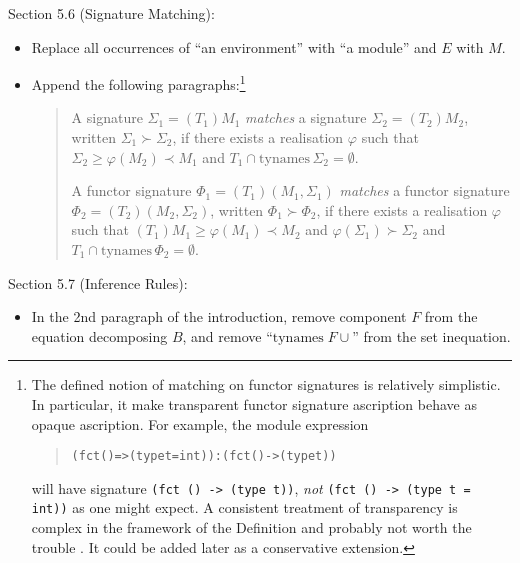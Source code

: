\documentclass[twoside,titlepage]{article}
\newcommand{\void}[1]{}
\begin{document}
\begin{appendix}
Section 5.6 (Signature Matching):
\begin{itemize}
\item Replace all occurrences of ``an environment'' with ``a module'' and $E$ with $M$.

\item Append the following paragraphs:\footnote{The defined notion of matching on functor signatures is relatively simplistic. In particular, it make transparent functor signature ascription behave as opaque ascription. For example, the module expression
\begin{quote}
\begin{alltt}
(fct () => (type t = int)) : (fct () -> (type t))
\end{alltt}
\end{quote}
will have signature {\tt (fct () -> (type t))}, \emph{not} {\tt (fct () -> (type t = int))} as one might expect. A consistent treatment of transparency is complex in the framework of the Definition and probably not worth the trouble \cite{higherfunctors}. It could be added later as a conservative extension.}
  \begin{quote}
\void{
  A signature $\Sigma_1 = (T_1)M_1$ \emph{matches} a signature $\Sigma_2 = (T_2)M_2$, written $\Sigma_1 \succ \Sigma_2$, if $M_1$ matches $\Sigma_2$ and $T_1 \cap \mbox{tynames}\,\Sigma_2 = \emptyset$ (possibly after changing the bound names in $T_1$).
}
  A signature $\Sigma_1 = (T_1)M_1$ \emph{matches} a signature $\Sigma_2 = (T_2)M_2$, written $\Sigma_1 \succ \Sigma_2$, if there exists a realisation $\varphi$ such that $\Sigma_2 \geq \varphi(M_2) \prec M_1$ and $T_1 \cap \mbox{tynames}\,\Sigma_2 = \emptyset$. %

  A functor signature $\Phi_1 = (T_1)(M_1,\Sigma_1)$ \emph{matches} a functor signature $\Phi_2 = (T_2)(M_2,\Sigma_2)$, written $\Phi_1 \succ \Phi_2$, if there exists a realisation $\varphi$ such that $(T_1)M_1 \geq \varphi(M_1) \prec M_2$ and $\varphi(\Sigma_1) \succ \Sigma_2$ and $T_1 \cap \mbox{tynames}\,\Phi_2 = \emptyset$. %
  \end{quote}
\end{itemize}

Section 5.7 (Inference Rules):
\begin{itemize}
\item In the 2nd paragraph of the introduction, remove component $F$ from the equation decomposing $B$, and remove ``$\mbox{tynames}\;F \cup$'' from the set inequation.


\end{itemize}
\end{appendix}
\end{document}

